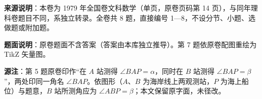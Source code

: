 

\begin{gktip}
\textbf{来源说明}：本卷为 1979 年全国卷文科数学（单页，原卷页码第 14 页），与同年理科卷题目不同，系独立转录。全卷共 8 题，直接编号 1—8，不设分节、小题、选做题或附加题。

\textbf{题面说明}：原卷题面不含答案（答案由本库独立推导）。第 7 题依原卷配图重绘为 TikZ 矢量图。

\textbf{源注}：第 5 题原卷印作“在 $A$ 站测得 $\angle BAP=\alpha$，同时在 $B$ 站测得 $\angle BAP=\beta$”，两处印同一角名 $\angle BAP$。依图形（$A$、$B$ 为海岸线上两观测站，$P$ 为海上船位）与题意，$B$ 站所测角应为 $\angle ABP=\beta$；本文保留原字面，未径改。
\end{gktip}

